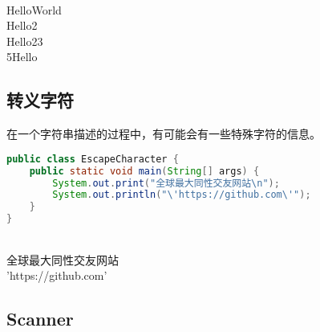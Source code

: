 \begin{tcolorbox}
	 \\
	HelloWorld \\
	Hello2 \\
	Hello23 \\
	5Hello
\end{tcolorbox}

\subsection{转义字符}

在一个字符串描述的过程中，有可能会有一些特殊字符的信息。

\begin{table}[H]
	\centering
	\caption{转义字符}
\end{table}


\begin{lstlisting}[language=Java]
public class EscapeCharacter {
	public static void main(String[] args) {
		System.out.print("全球最大同性交友网站\n");
		System.out.println("\'https://github.com\'");
	}
}
\end{lstlisting}

\begin{tcolorbox}
	 \\
	全球最大同性交友网站 \\
	'https://github.com'
\end{tcolorbox}

\subsection{Scanner}

